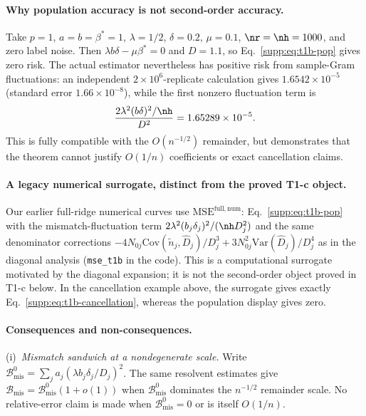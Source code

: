 \paragraph{Why population accuracy is not second-order accuracy.}
Take $p=1$, $a=b=\beta^*=1$, $\lambda=1/2$, $\delta=0.2$, $\mu=0.1$, $\nr=\nh=1000$, and zero label noise.
Then $\lambda b\delta-\mu\beta^*=0$ and $D=1.1$, so Eq.~\eqref{supp:eq:t1b-pop} gives zero risk.
The actual estimator nevertheless has positive risk from sample-Gram fluctuations: an independent $2\times10^6$-replicate calculation gives $1.6542\times10^{-5}$ (standard error $1.66\times10^{-8}$), while the first nonzero fluctuation term is
\begin{equation}
  \frac{2\lambda^2(b\delta)^2/\nh}{D^2}=1.65289\times10^{-5}.
  \label{supp:eq:t1b-cancellation}
\end{equation}
This is fully compatible with the $O(n^{-1/2})$ remainder, but demonstrates that the theorem cannot justify $O(1/n)$ coefficients or exact cancellation claims.

\paragraph{A legacy numerical surrogate, distinct from the proved T1-c object.}
Our earlier full-ridge numerical curves use $\mathrm{MSE}^{\mathrm{full,num}}$: Eq.~\eqref{supp:eq:t1b-pop} with the mismatch-fluctuation term $2\lambda^2(b_j\delta_j)^2/(\nh D_j^2)$ and the same denominator corrections $-4N_{0j}\mathrm{Cov}(\tilde n_j,\hat D_j)/D_j^3+3N_{0j}^2\mathrm{Var}(\hat D_j)/D_j^4$ as in the diagonal analysis (\texttt{mse\_t1b} in the code).
This is a computational surrogate motivated by the diagonal expansion; it is not the second-order object proved in T1-c below.
In the cancellation example above, the surrogate gives exactly Eq.~\eqref{supp:eq:t1b-cancellation}, whereas the population display gives zero.

\paragraph{Consequences and non-consequences.}
(i)~\emph{Mismatch sandwich at a nondegenerate scale.}
Write $\mathcal B_{\mathrm{mis}}^0=\sum_j a_j(\lambda b_j\delta_j/D_j)^2$.
The same resolvent estimates give $\mathcal B_{\mathrm{mis}}=\mathcal B_{\mathrm{mis}}^0(1+o(1))$ when $\mathcal B_{\mathrm{mis}}^0$ dominates the $n^{-1/2}$ remainder scale.
No relative-error claim is made when $\mathcal B_{\mathrm{mis}}^0=0$ or is itself $O(1/n)$.

